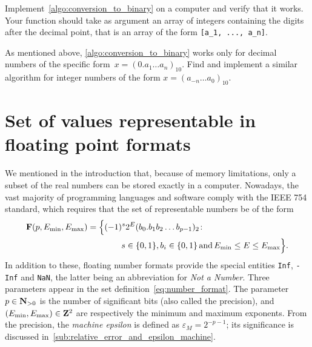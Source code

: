 \begin{exercise}
    Implement~\cref{algo:conversion_to_binary} on a computer and verify that it works.
    Your function should take as argument an array of integers containing the digits after the decimal point,
    that is an array of the form \verb?[a_1, ..., a_n]?.
\end{exercise}

\begin{exercise}
    As mentioned above, \cref{algo:conversion_to_binary} works only for decimal numbers of the specific form~$x = (0.a_1\dots a_n)_{10}$.
    Find and implement a similar algorithm for integer numbers of the form $x = (a_{-n} \dots a_{0})_{10}$.
\end{exercise}

\section{Set of values representable in floating point formats}%
\label{sec:set_of_values}
We mentioned in the introduction that,
because of memory limitations,
only a subset of the real numbers can be stored exactly in a computer.
Nowadays, the vast majority of programming languages and software comply with the IEEE 754 standard,
which requires that the set of representable numbers be of the form
\begin{align}
    \notag
    \floating (p, E_{\min}, E_{\max})
    = \Bigl\{ & (-1)^s 2^E (b_0. b_1 b_2 \dots b_{p-1})_2 \colon \\
    \label{eq:number_format}%
              & \qquad s \in \{0, 1\}, b_i \in \{0, 1\} \, \text{and} \, E_{\min} \leq E \leq E_{\max} \Bigr\}.
\end{align}
In addition to these, floating number formats provide the special entities \texttt{Inf}, \texttt{-Inf} and \texttt{NaN},
the latter being an abbreviation for \emph{Not a Number}.
Three parameters appear in the set definition~\eqref{eq:number_format}.
The parameter $p \in \mathbf N_{>0}$ is the number of significant bits (also called the precision),
and $(E_{\min}, E_{\max}) \in \mathbf Z^2$ are respectively the minimum and maximum exponents.
From the precision, the \emph{machine epsilon} is defined as $\varepsilon_{M} = 2^{-p-1}$;
its significance is discussed in~\cref{sub:relative_error_and_epsilon_machine}.

